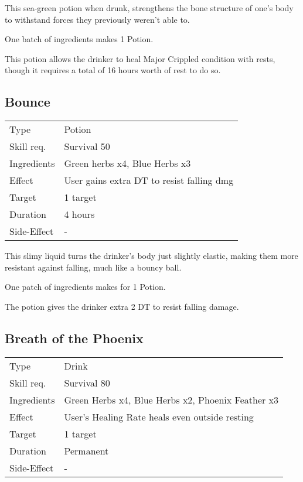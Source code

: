 \documentclass[11pt,a4paper,twocolumn]{book}
\begin{document}
\medskip

This sea-green potion when drunk, strengthens the bone structure of one's body to withstand forces they previously weren't able to.

One batch of ingredients makes 1 Potion.

This potion allows the drinker to heal Major Crippled condition with rests, though it requires a total of 16 hours worth of rest to do so.

\vfill

\subsection*{Bounce}
{
	\begin{tabu} to 75mm{| X[l,4] | X[l,8] |}
		\hline
		Type 			& Potion 													\\
		Skill req.	    & Survival 50 												\\
		Ingredients     & Green herbs x4, Blue Herbs x3								\\
		Effect     		& User gains extra DT to resist falling dmg					\\
		Target      	& 1 target													\\
		Duration  		& 4 hours	 												\\
		Side-Effect     & -															\\ \hline
	\end{tabu}
	
}

\medskip

This slimy liquid turns the drinker's body just slightly elastic, making them more resistant against falling, much like a bouncy ball.

One patch of ingredients makes for 1 Potion.

The potion gives the drinker extra 2 DT to resist falling damage.



\subsection*{Breath of the Phoenix}
{
	\begin{tabu} to 75mm{| X[l,4] | X[l,8] |}
		\hline
		Type 			& Drink 													\\
		Skill req.	    & Survival 80 												\\
		Ingredients     & Green Herbs x4, Blue Herbs x2, Phoenix Feather x3			\\
		Effect     		& User's Healing Rate heals even outside resting			\\
		Target      	& 1 target													\\
		Duration  		& Permanent 												\\
		Side-Effect     & -															\\ \hline
	\end{tabu}
	
}
\end{document}

